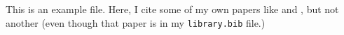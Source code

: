 \documentclass[11pt,english]{article}
\begin{document}
This is an example file. Here, I cite some of my own papers like \citet{Feigenbaum2016} and \citet{Feigenbaum2015a}, but not another (even though that paper is in my \texttt{library.bib} file.)



\end{document}
